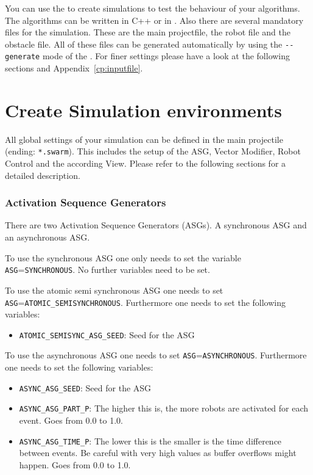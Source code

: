 
You can use the \RSS to create simulations to test the behaviour of your algorithms. The algorithms can be written in {\sffamily C++} or in \Lua. Also there are several mandatory files for the simulation. These are the main projectfile, the robot file and the obstacle file. All of these files can be generated automatically by using the \texttt{-{}-generate} mode of the \RSS. For finer settings please have a look at the following sections and Appendix~\ref{cp:inputfile}.


\section{Create Simulation environments}
All global settings of your simulation can be defined in the main projectile (ending: \texttt{*.swarm}). This includes the setup of the ASG, Vector Modifier, Robot Control and the according View. Please refer to the following sections for a detailed description.


\subsubsection{Activation Sequence Generators}

There are two Activation Sequence Generators (ASGs). A synchronous ASG and an asynchronous ASG.

To use the synchronous ASG one only needs to set the variable \texttt{ASG}=\texttt{SYNCHRONOUS}. No further variables need to be set.

To use the atomic semi synchronous ASG one needs to set \texttt{ASG}=\texttt{ATOMIC\_SEMISYNCHRONOUS}. Furthermore one needs to set the following variables:
\begin{itemize}
\item \texttt{ATOMIC\_SEMISYNC\_ASG\_SEED}: Seed for the ASG
\end{itemize}

To use the asynchronous ASG one needs to set \texttt{ASG}=\texttt{ASYNCHRONOUS}. Furthermore one needs to set the following variables:
\begin{itemize}
\item \texttt{ASYNC\_ASG\_SEED}: Seed for the ASG
\item \texttt{ASYNC\_ASG\_PART\_P}: The higher this is, the more robots are activated for each event. Goes from 0.0 to 1.0.
\item \texttt{ASYNC\_ASG\_TIME\_P}: The lower this is the smaller is the time difference between events. Be careful with very high values as buffer overflows might happen. Goes from 0.0 to 1.0.
\end{itemize}



